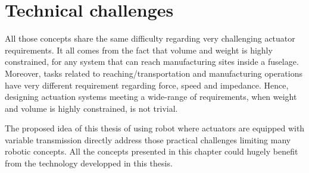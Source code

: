 \section{Technical challenges}

All those concepts share the same difficulty regarding very challenging actuator requirements. It all comes from the fact that volume and weight is highly constrained, for any system that can reach manufacturing sites inside a fuselage. Moreover, tasks related to reaching/transportation and manufacturing operations have very different requirement regarding force, speed and impedance. Hence, designing actuation systems meeting a wide-range of requirements, when weight and volume is highly constrained, is not trivial. 

The proposed idea of this thesis of using robot where actuators are equipped with variable transmission directly address those practical challenges limiting many robotic concepts. All the concepts presented in this chapter could hugely benefit from the technology developped in this thesis. 
